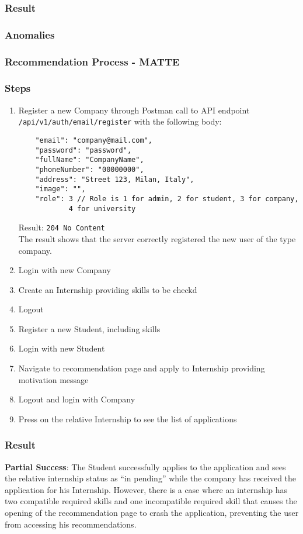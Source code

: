 \subsubsection*{Result}
\subsubsection*{Anomalies}
\subsubsection{Recommendation Process - MATTE}
\subsubsection*{Steps}
\begin{enumerate}
    \item  Register a new Company through Postman call to API endpoint \verb|/api/v1/auth/email/register| with the following body:
    \begin{verbatim}
    "email": "company@mail.com",
    "password": "password",
    "fullName": "CompanyName",
    "phoneNumber": "00000000",
    "address": "Street 123, Milan, Italy",
    "image": "",
    "role": 3 // Role is 1 for admin, 2 for student, 3 for company,
            4 for university
    \end{verbatim}
    Result: \verb |204 No Content|\\
    The result shows that the server correctly registered the new user of the type company.
    \item Login with new Company
    \item Create an Internship providing skills to be checkd
    \item Logout
    \item Register a new Student, including skills
    \item Login with new Student
    \item Navigate to recommendation page and apply to Internship providing motivation message
    \item Logout and login with Company 
    \item Press on the relative Internship to see the list of applications
\end{enumerate}
\subsubsection*{Result}
\textbf{Partial Success}: The Student successfully applies to the application and sees the relative internship status as “in pending” while the company has received the application for his Internship. However, there is a case where an internship has two compatible required skills and one incompatible required skill that causes the opening of the recommendation page to crash the application, preventing the user from accessing his recommendations.  
